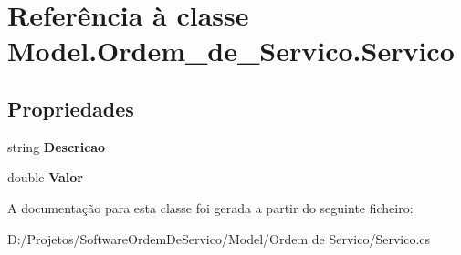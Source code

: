 \hypertarget{class_model_1_1_ordem__de___servico_1_1_servico}{}\section{Referência à classe Model.\+Ordem\+\_\+de\+\_\+\+Servico.\+Servico}
\label{class_model_1_1_ordem__de___servico_1_1_servico}
\subsection*{Propriedades}
\begin{DoxyCompactItemize}
\item 
\hypertarget{class_model_1_1_ordem__de___servico_1_1_servico_a094d3e4aa689cb0c8df45206b7f1a5fc}{}string {\bfseries Descricao}\label{class_model_1_1_ordem__de___servico_1_1_servico_a094d3e4aa689cb0c8df45206b7f1a5fc}

\item 
\hypertarget{class_model_1_1_ordem__de___servico_1_1_servico_a54366b1a10051d3df2084aaa14691643}{}double {\bfseries Valor}\label{class_model_1_1_ordem__de___servico_1_1_servico_a54366b1a10051d3df2084aaa14691643}

\end{DoxyCompactItemize}


A documentação para esta classe foi gerada a partir do seguinte ficheiro\+:\begin{DoxyCompactItemize}
\item 
D\+:/\+Projetos/\+Software\+Ordem\+De\+Servico/\+Model/\+Ordem de Servico/Servico.\+cs\end{DoxyCompactItemize}
